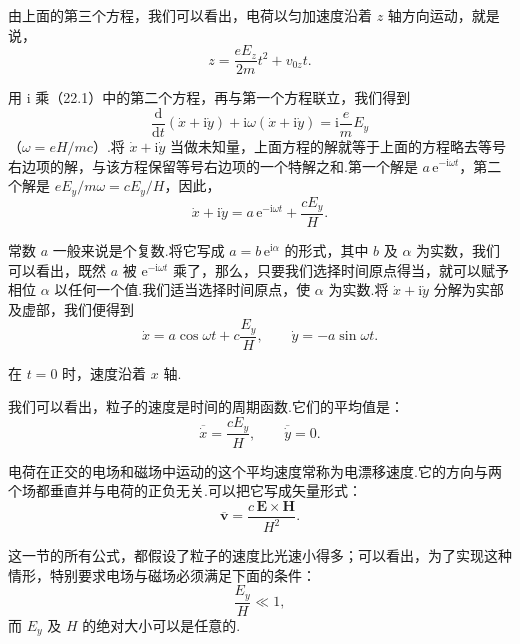 由上面的第三个方程，我们可以看出，电荷以匀加速度沿着 $z$ 轴方向运动，就是说，
\begin{equation}
  z=\frac{eE_z}{2m}t^2+v_{0z}t.
\end{equation}

用 $\mathrm{i}$ 乘（22.1）中的第二个方程，再与第一个方程联立，我们得到
\begin{equation*}
  \frac{\mathrm{d}}{\mathrm{d}t}\left(\dot{x}+\mathrm{i}\dot{y}\right)
  +\mathrm{i}\omega\left(\dot{x}+\mathrm{i}\dot{y}\right)
  =\mathrm{i}\frac{e}{m}E_y
\end{equation*}
（$\omega=eH/mc$）.将 $\dot{x}+\mathrm{i}\dot{y}$ 当做未知量，上面方程的解就等于上面的方程略去等号右边项的解，与该方程保留等号右边项的一个特解之和.第一个解是
$a\,\mathrm{e}^{-\mathrm{i}\omega t}$，第二个解是 $eE_y/m\omega=cE_y/H$，因此，
\begin{equation*}
  \dot{x}+\mathrm{i}\dot{y}=a\,\mathrm{e}^{-\mathrm{i}\omega t}+\frac{cE_y}{H}.
\end{equation*}

常数 $a$ 一般来说是个复数.将它写成 $a=b\,\mathrm{e}^{\mathrm{i}\alpha}$ 的形式，其中 $b$ 及
$\alpha$ 为实数，我们可以看出，既然 $a$ 被 $\mathrm{e}^{-\mathrm{i}\omega t}$ 乘了，那么，只要我们选择时间原点得当，就可以赋予相位
$\alpha$ 以任何一个值.我们适当选择时间原点，使 $\alpha$ 为实数.将
$\dot{x}+\mathrm{i}\dot{y}$ 分解为实部及虚部，我们便得到
\begin{equation}
  \dot{x}=a\cos\omega t+c\frac{E_y}{H},\qquad
  \dot{y}=-a\sin\omega t.
\end{equation}

在 $t=0$ 时，速度沿着 $x$ 轴.

我们可以看出，粒子的速度是时间的周期函数.它们的平均值是：
\begin{equation*}
  \overline{\dot{x}}=\frac{cE_y}{H},\qquad \overline{\dot{y}}=0.
\end{equation*}

电荷在正交的电场和磁场中运动的这个平均速度常称为电漂移速度.它的方向与两个场都垂直并与电荷的正负无关.可以把它写成矢量形式：
\begin{equation}
  \overline{\boldsymbol{v}}=\frac{c\,\boldsymbol{E}\times\boldsymbol{H}}{H^2}.
\end{equation}

这一节的所有公式，都假设了粒子的速度比光速小得多；可以看出，为了实现这种情形，特别要求电场与磁场必须满足下面的条件：
\begin{equation}
  \frac{E_y}{H}\ll1,
\end{equation}
而 $E_y$ 及 $H$ 的绝对大小可以是任意的.


